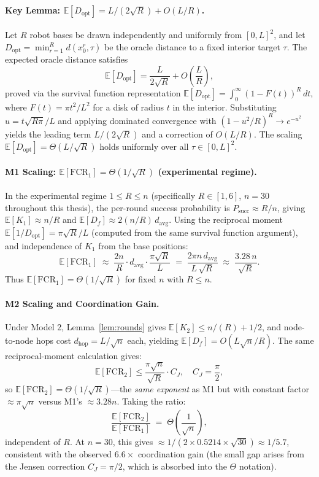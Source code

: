 \begin{doublespacing}
\paragraph{Key Lemma: $\mathbb{E}[D_{\mathrm{opt}}] = L/(2\sqrt{R}) + O(L/R)$.}
Let $R$ robot bases be drawn independently and uniformly from $[0,L]^2$,
and let $D_{\mathrm{opt}} = \min_{r=1}^{R} d(x_0^r, \tau)$ be the
oracle distance to a fixed interior target $\tau$.
The expected oracle distance satisfies
\[
  \mathbb{E}[D_{\mathrm{opt}}] = \frac{L}{2\sqrt{R}} + O\!\left(\frac{L}{R}\right),
\]
proved via the survival function representation
$\mathbb{E}[D_{\mathrm{opt}}] = \int_0^\infty (1 - F(t))^R\,dt$,
where $F(t) = \pi t^2/L^2$ for a disk of radius $t$ in the interior.
Substituting $u = t\sqrt{R\pi}/L$ and applying dominated convergence
with $(1-u^2/R)^R \to e^{-u^2}$ yields the leading term $L/(2\sqrt{R})$
and a correction of $O(L/R)$. The scaling $\mathbb{E}[D_{\mathrm{opt}}]
= \Theta(L/\sqrt{R})$ holds uniformly over all $\tau \in [0,L]^2$.

\paragraph{M1 Scaling: $\mathbb{E}[\mathrm{FCR}_1] = \Theta(1/\sqrt{R})$ (experimental regime).}
In the experimental regime $1 \leq R \leq n$ (specifically $R \in [1,6]$,
$n = 30$ throughout this thesis), the per-round success probability is
$P_{\mathrm{succ}} \approx R/n$, giving $\mathbb{E}[K_1] \approx n/R$
and $\mathbb{E}[D_f] \approx 2(n/R)\,d_{\mathrm{avg}}$.
Using the reciprocal moment $\mathbb{E}[1/D_{\mathrm{opt}}] = \pi\sqrt{R}/L$
(computed from the same survival function argument), and independence of
$K_1$ from the base positions:
\[
  \mathbb{E}[\mathrm{FCR}_1]
  \;\approx\; \frac{2n}{R}\cdot d_{\mathrm{avg}} \cdot \frac{\pi\sqrt{R}}{L}
  \;=\; \frac{2\pi n\,d_{\mathrm{avg}}}{L\,\sqrt{R}}
  \;\approx\; \frac{3.28\,n}{\sqrt{R}}.
\]
Thus $\mathbb{E}[\mathrm{FCR}_1] = \Theta(1/\sqrt{R})$ for fixed $n$
with $R \leq n$.

\paragraph{M2 Scaling and Coordination Gain.}
Under Model 2, Lemma~\ref{lem:rounds} gives $\mathbb{E}[K_2] \leq n/(R) + 1/2$,
and node-to-node hops cost $d_{\mathrm{hop}} = L/\sqrt{n}$ each, yielding
$\mathbb{E}[D_f] = O(L\sqrt{n}/R)$.
The same reciprocal-moment calculation gives:
\[
  \mathbb{E}[\mathrm{FCR}_2] \leq \frac{\pi\sqrt{n}}{\sqrt{R}} \cdot C_J,
  \quad C_J = \frac{\pi}{2},
\]
so $\mathbb{E}[\mathrm{FCR}_2] = \Theta(1/\sqrt{R})$---the \emph{same exponent}
as M1 but with constant factor $\approx \pi\sqrt{n}$ versus M1's $\approx 3.28n$.
Taking the ratio:
\[
  \frac{\mathbb{E}[\mathrm{FCR}_2]}{\mathbb{E}[\mathrm{FCR}_1]}
  \;=\; \Theta\!\left(\frac{1}{\sqrt{n}}\right),
\]
independent of $R$. At $n = 30$, this gives
$\approx 1/(2 \times 0.5214 \times \sqrt{30}) \approx 1/5.7$,
consistent with the observed $6.6\times$ coordination gain (the
small gap arises from the Jensen correction $C_J = \pi/2$, which is
absorbed into the $\Theta$ notation).


\end{doublespacing}
